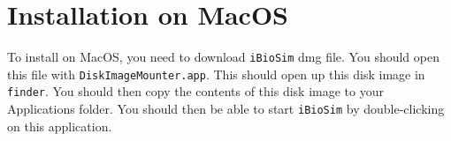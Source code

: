 \documentclass[titlepage,11pt]{article}
\begin{document}
\clearpage

\section{Installation on MacOS}

\noindent
To install on MacOS, you need to download {\tt iBioSim} dmg file.  You should
open this file with {\tt DiskImageMounter.app}.  This should open up
this disk image in {\tt finder}.  You should then copy the contents of
this disk image to your Applications folder.  You should then be able
to start {\tt iBioSim} by double-clicking on this application. 
\end{document}
